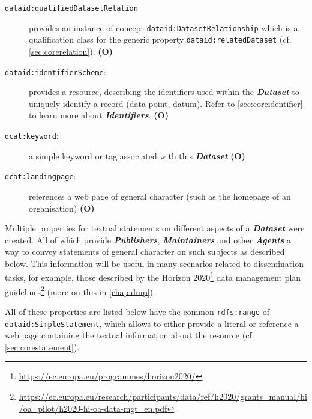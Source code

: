 \documentclass[a4paper,english,twoside,BCOR1.5cm,headsepline,DIV12,appendixprefix,final,12pt]{scrbook}
\newcommand{\prop}[1]{{{\texttt{#1}}}}
\newcommand{\important}[1]{\textbf{\textit{#1}}}
\newcommand\footnoteurl[1]{\footnote{\scriptsize\url{#1}}}
\begin{document}
\begin{description}
\item[\prop{dataid:qualifiedDatasetRelation}] provides an instance of concept \prop{dataid:DatasetRelationship} which is a qualification class for the generic property \prop{dataid:relatedDataset} (cf. \cref{sec:corerelation}). \textbf{(O)}
\item[\prop{dataid:identifierScheme}:] provides a resource, describing the identifiers used within the \important{Dataset} to uniquely identify a record (data point, datum). Refer to \cref{sec:coreidentifier} to learn more about \important{Identifiers}. \textbf{(O)}
\item[\prop{dcat:keyword}:] a simple keyword or tag associated with this \important{Dataset} \textbf{(O)}
\item[\prop{dcat:landingpage}:] references a web page of general character (such as the homepage of an organisation) \textbf{(O)}
\end{description}

Multiple properties for textual statements on different aspects of a \important{Dataset} were created. All of which provide \important{Publishers}, \important{Maintainers} and other \important{Agents} a way to convey statements of general character on such subjects as described below. This information will be useful in many scenarios related to dissemination tasks, for example, those described by the Horizon 2020\footnoteurl{https://ec.europa.eu/programmes/horizon2020/} data management plan guidelines\footnoteurl{https://ec.europa.eu/research/participants/data/ref/h2020/grants_manual/hi/oa_pilot/h2020-hi-oa-data-mgt_en.pdf} (more on this in \cref{chap:dmp}).

All of these properties are listed below have the common \prop{rdfs:range} of \prop{dataid:SimpleStatement}, which allows to either provide a literal or reference a web page containing the textual information about the resource (cf. \cref{sec:corestatement}). 
\end{document}
